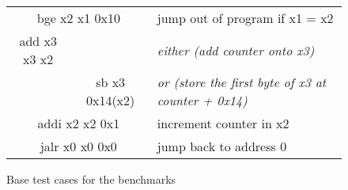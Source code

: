 \begin{figure}
    \centering
    \begin{tabular}{c | c >{\slshape}l}
        \multicolumn{2}{c}{\ttfamily bge x2 x1 0x10} & jump out of program if x1 = x2                                                     \\
        \ttfamily add x3 x3 x2                       &                                & either (add counter onto x3)                      \\
                                                     & \ttfamily sb x3 0x14(x2)       & or (store the first byte of x3 at counter + 0x14) \\
        \multicolumn{2}{c}{\ttfamily addi x2 x2 0x1} & increment counter in x2                                                            \\
        \multicolumn{2}{c}{\ttfamily jalr x0 x0 0x0} & jump back to address 0                                                             \\
    \end{tabular}
    \caption[Base test cases]{Base test cases for the benchmarks}\label{fig:base_test_risc}
\end{figure}